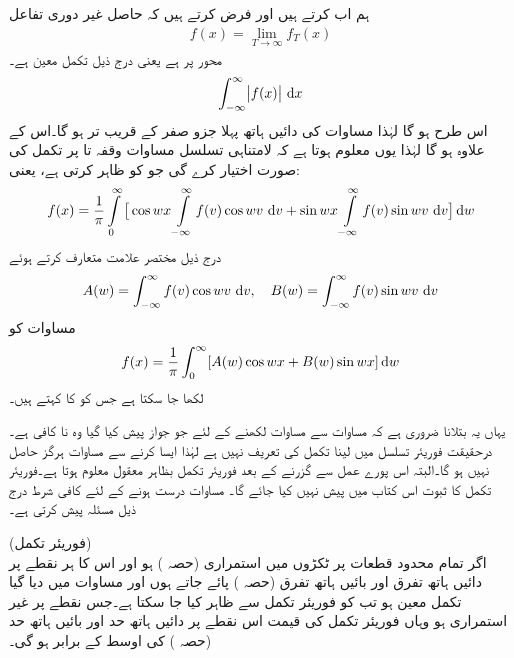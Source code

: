 ہم اب  کرتے ہیں اور فرض کرتے ہیں کہ حاصل غیر دوری تفاعل
\begin{align*}
f(x)=\lim_{T\to \infty} f_T(x)
\end{align*}
 محور پر  ہے یعنی درج ذیل تکمل معین ہے۔
\begin{align}\label{مساوات_فوریئر_تکمل_ب}
\int_{-\infty}^{\infty}\abs{f(x)}\,\dif x
\end{align} 
اس طرح  ہو گا لہٰذا مساوات  کی دائیں ہاتھ پہلا جزو صفر کے قریب تر ہو گا۔اس کے علاوہ   ہو گا لہٰذا  یوں معلوم ہوتا ہے کہ لامتناہی تسلسل مساوات  وقفہ  تا  پر تکمل کی صورت اختیار کرے گی جو  کو ظاہر کرتی ہے، یعنی:
\begin{align}\label{مساوات_فوریئر_تکمل_پ}
f(x)=\frac{1}{\pi}\int\limits_{0}^{\infty}\big[\cos wx\int\limits_{-\infty}^{\infty}f(v)\cos wv\,\dif v+\sin wx\int\limits_{-\infty}^{\infty}f(v)\sin wv\,\dif v\big]\dif w
\end{align}
درج ذیل مختصر علامت متعارف کرتے ہوئے
\begin{align}\label{مساوات_فوریئر_تکمل_ت}
A(w)=\int_{-\infty}^{\infty}f(v)\cos wv\,\dif v,\quad B(w)=\int_{-\infty}^{\infty}f(v)\sin wv\,\dif v
\end{align}
مساوات  کو
\begin{align}\label{مساوات_فوریئر_تکمل_ٹ}
f(x)=\frac{1}{\pi}\int_0^{\infty}[A(w)\cos wx+B(w)\sin wx]\dif w
\end{align}
لکھا جا سکتا ہے جس کو  کا  کہتے ہیں۔

یہاں یہ بتلانا ضروری ہے کہ مساوات  سے مساوات  لکھنے کے لئے جو جواز پیش کیا گیا وہ نا کافی ہے۔درحقیقت فوریئر تسلسل میں  لینا تکمل کی تعریف نہیں ہے لہٰذا ایسا کرنے سے مساوات  ہرگز حاصل نہیں ہو گا۔البتہ اس پورے عمل سے  گزرنے کے بعد  فوریئر تکمل بظاہر معقول معلوم ہوتا ہے۔فوریئر تکمل کا ثبوت اس کتاب میں پیش نہیں کیا جائے گا۔  مساوات  درست ہونے کے لئے کافی شرط درج ذیل مسئلہ پیش کرتی ہے۔ 

\quad (فوریئر تکمل)\\
اگر  تمام محدود قطعات پر ٹکڑوں میں استمراری (حصہ ) ہو اور اس کا ہر نقطے پر دائیں ہاتھ تفرق اور بائیں ہاتھ تفرق (حصہ ) پائے جاتے ہوں اور مساوات  میں دیا گیا تکمل معین ہو تب  کو فوریئر تکمل سے ظاہر کیا جا سکتا ہے۔جس نقطے پر  غیر استمراری ہو وہاں فوریئر تکمل کی قیمت اس نقطے پر دائیں ہاتھ حد اور بائیں ہاتھ حد (حصہ ) کی اوسط کے برابر ہو گی۔ 


